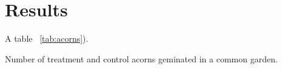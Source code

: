 \documentclass[../main.tex]{article}
\begin{document}
\section{Results}

A table ~\ref{tab:acorns}).

\begin{table}[ht!]
\centering
{}
\caption{Number of treatment and control acorns geminated in a common garden.}
\label{tab:acorns}
\end{table}
\end{document}
